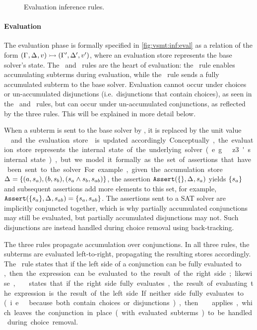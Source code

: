 \begin{figure}
  
  \caption{Evaluation inference rules.}
  \label{fig:vsmt:inf:eval}
\end{figure}


\paragraph{Evaluation}
%
The evaluation phase is formally specified in \autoref{fig:vsmt:inf:eval} as a
relation of the form
$(\Gamma_{},\Delta_{},v)\rightarrowtail{}(\Gamma_{}',\Delta_{}',v')$, where an
evaluation store \eStore{} represents the base solver's state.
%
The \evAcc\ and \evSym\ rules are the heart of evaluation: the \evAcc\ rule
enables accumulating subterms during evaluation, while the \evSym\ rule sends a
fully accumulated subterm to the base solver. Evaluation cannot occur under
choices or un-accumulated disjunctions (i.e.\ disjunctions that contain
choices), as seen in the \evChc\ and \evOr\ rules, but can occur under
un-accumulated conjunctions, as reflected by the three  rules. This
will be explained in more detail below.


When a subterm is sent to the base solver by \evSym, it is replaced by the unit
value \unit\ and the evaluation store \eStore{} is updated accordingly.
%
Conceptually, the evaluation store represents the internal state of the
underlying solver (e.g.\ z3's internal state), but we model it formally as the
set of assertions that have been sent to the solver. For example, given the
accumulation store $\aStore{}=\set{(a,s_a),(b,s_b),(s_a \wedge s_b, s_{ab})}$,
the assertion $\passert(\set{},\aStore{},s_{a})$ yields $\set{s_a}$ and
subsequent assertions add more elements to this set, for example,
$\passert(\set{s_a},\aStore{},s_{ab})=\set{s_a,s_{ab}}$.
%
The assertions sent to a SAT solver are implicitly conjuncted together, which
is why partially accumulated conjunctions may still be evaluated, but partially
accumulated disjunctions may not. Such disjunctions are instead handled during
choice removal using back-tracking.


The three  rules propagate accumulation over conjunctions. In all
three rules, the subterms are evaluated left-to-right, propagating the
resulting stores accordingly.
%
The \evAndL\ rule states that if the left side of a conjunction can be fully
evaluated to \unit, then the expression can be evaluated to the result of the
right side; likewise, \evAndR\ states that if the right side fully evaluates,
the result of evaluating the expression is the result of the left side. If
neither side fully evaluates to \unit\ (i.e.\ because both contain choices or
disjunctions), then \evAnd\ applies, which leaves the conjunction in place
(with evaluated subterms) to be handled during choice removal.


